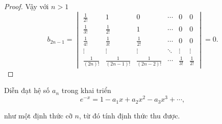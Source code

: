 \documentclass[class=nhvh-linear-algebra,crop=false]{standalone}
\begin{document}
\begin{proof}
	\par Vậy với $n > 1$
	\[
		b_{2n-1} =
		\begin{vmatrix}
			\frac{1}{2!}    & 1                 & 0                 & \cdots & 0            & 0            \\
			\frac{1}{3!}    & \frac{1}{2!}      & 1                 & \cdots & 0            & 0            \\
			\frac{1}{4!}    & \frac{1}{3!}      & \frac{1}{2!}      & \cdots & 0            & 0            \\
			\vdots          & \vdots            & \vdots            & \ddots & \vdots       & \vdots       \\
			\frac{1}{(2n)!} & \frac{1}{(2n-1)!} & \frac{1}{(2n-2)!} & \cdots & \frac{1}{3!} & \frac{1}{2!}
		\end{vmatrix}
		= 0.
	\]
\end{proof}

\begin{exercise}
	\par Diễn đạt hệ số $a_{n}$ trong khai triển
	\[
		e^{-x} = 1 - a_{1}x + a_{2}x^{2} - a_{3}x^{3} + \cdots ,
	\]
	\par như một định thức cỡ $n$, từ đó tính định thức thu được.
\end{exercise}
\end{document}
